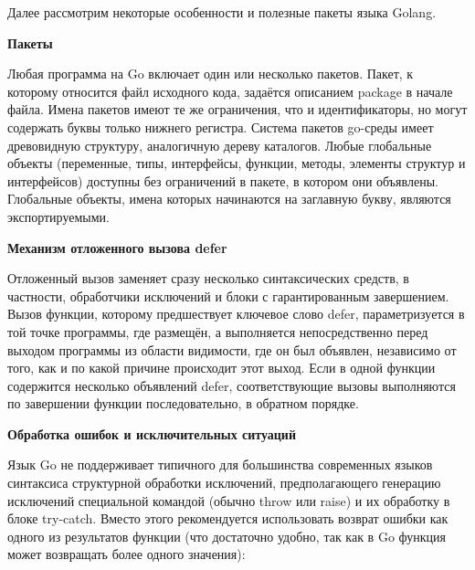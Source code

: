 Далее рассмотрим некоторые особенности и полезные пакеты языка Golang.

\textbf{Пакеты}

Любая программа на Go включает один или несколько пакетов. Пакет, к которому относится файл исходного кода, задаётся описанием package в начале файла. Имена пакетов имеют те же ограничения, что и идентификаторы, но могут содержать буквы только нижнего регистра. Система пакетов go-среды имеет древовидную структуру, аналогичную дереву каталогов. Любые глобальные объекты (переменные, типы, интерфейсы, функции, методы, элементы структур и интерфейсов) доступны без ограничений в пакете, в котором они объявлены. Глобальные объекты, имена которых начинаются на заглавную букву, являются экспортируемыми.

\textbf{Механизм отложенного вызова defer}

Отложенный вызов заменяет сразу несколько синтаксических средств, в частности, обработчики исключений и блоки с гарантированным завершением. Вызов функции, которому предшествует ключевое слово defer, параметризуется в той точке программы, где размещён, а выполняется непосредственно перед выходом программы из области видимости, где он был объявлен, независимо от того, как и по какой причине происходит этот выход. Если в одной функции содержится несколько объявлений defer, соответствующие вызовы выполняются по завершении функции последовательно, в обратном порядке.

\textbf{Обработка ошибок и исключительных ситуаций}

Язык Go не поддерживает типичного для большинства современных языков синтаксиса структурной обработки исключений, предполагающего генерацию исключений специальной командой (обычно throw или raise) и их обработку в блоке try-catch. Вместо этого рекомендуется использовать возврат ошибки как одного из результатов функции (что достаточно удобно, так как в Go функция может возвращать более одного значения):

